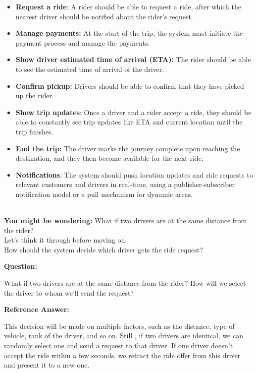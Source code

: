 \begin{itemize}
\item
\protect{}\label{kcLPe-nR_SitUiTHBB12l}
\textbf{Request a ride}: A rider should be able to request a ride, after which the nearest driver should be notified about the rider's request.
\item
\protect{}\label{00SUEEYEuU70c0g3_fqFj}
\textbf{Manage payments:} At the start of the trip, the system must initiate the payment process and manage the payments.
\item
\protect{}\label{qLK75tZqSg6utr9sfthyz}
\textbf{Show driver estimated time of arrival (ETA):} The rider should be able to see the estimated time of arrival of the driver.
\item
\protect{}\label{9gIgpbRyURfmmLasPzfyO}
\textbf{Confirm pickup:} Drivers should be able to confirm that they have picked up the rider.
\item
\protect{}\label{fwKYW_eN5Wj6EuNDVd8FA}
\textbf{Show trip updates}: Once a driver and a rider accept a ride, they should be able to constantly see trip updates like ETA and current location until the trip finishes.
\item
\protect{}\label{LBOrIegEBx4aPuzPVmZ3N}
\textbf{End the trip:} The driver marks the journey complete upon reaching the destination, and they then become available for the next ride.
\item
\protect{}\label{bjHLhWYNdJ9YFzTcfeQvY}
\textbf{Notifications}: The system should push location updates and ride requests to relevant customers and drivers in real-time, using a publisher-subscriber notification model or a pull mechanism for dynamic areas.
\end{itemize}
\\
\textbf{You might be wondering:} What if two drivers are at the same distance from the rider?\\
Let's think it through before moving on.
\\
How should the system decide which driver gets the ride request?

\textbf{Question:}

What if two drivers are at the same distance from the rider? How will we select the driver to whom we'll send the request?

\textbf{Reference Answer:}

This decision will be made on multiple factors, such as the distance, type of vehicle, rank of the driver, and so on. Still , if two drivers are identical, we can randomly select one and send a request to that driver. If one driver doesn't accept the ride within a few seconds, we retract the ride offer from this driver and present it to a new one.

